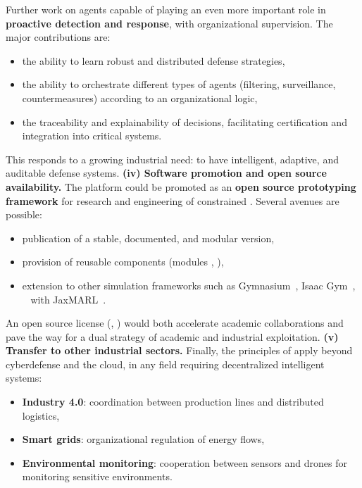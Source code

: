 Further work on  agents capable of playing an even more important role in \textbf{proactive detection and response}, with organizational supervision.
The major contributions are:
\begin{itemize}
  \item the ability to learn robust and distributed defense strategies,
  \item the ability to orchestrate different types of agents (filtering, surveillance, countermeasures) according to an organizational logic,
  \item the traceability and explainability of decisions, facilitating certification and integration into critical systems.
\end{itemize}
This responds to a growing industrial need: to have intelligent, adaptive, and auditable defense systems.
\medskip
\noindent
\textbf{(iv) Software promotion and open source availability.}
The  platform could be promoted as an \textbf{open source prototyping framework} for research and engineering of constrained .
Several avenues are possible:
\begin{itemize}
  \item publication of a stable, documented, and modular version,
  \item provision of reusable components (modules , ),
  \item extension to other simulation frameworks such as Gymnasium~\cite{kwiatkowski2024}, Isaac Gym~\cite{Makoviychuk2021}, ~\cite{Frostig2019} with JaxMARL~\cite{Rutherford2024}.
\end{itemize}
An open source license (, ) would both accelerate academic collaborations and pave the way for a dual strategy of academic and industrial exploitation.
\medskip
\noindent
\textbf{(v) Transfer to other industrial sectors.}
Finally, the principles of  apply beyond cyberdefense and the cloud, in any field requiring decentralized intelligent systems:
\begin{itemize}

  \item \textbf{Industry 4.0}: coordination between production lines and distributed logistics,
  \item \textbf{Smart grids}: organizational regulation of energy flows,
  \item \textbf{Environmental monitoring}: cooperation between sensors and drones for monitoring sensitive environments.
\end{itemize}
